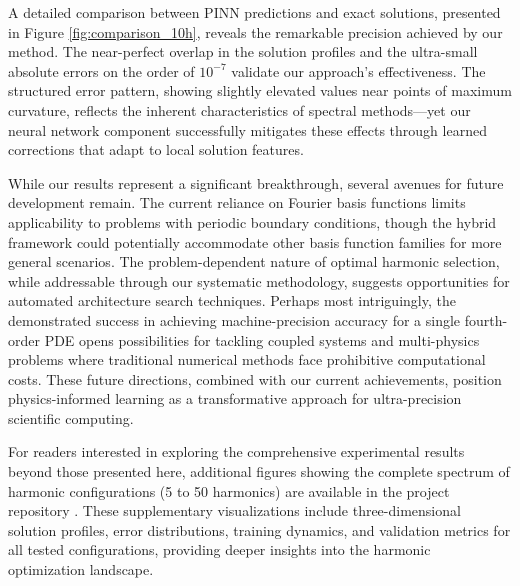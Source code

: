 A detailed comparison between PINN predictions and exact solutions, presented in Figure \ref{fig:comparison_10h}, reveals the remarkable precision achieved by our method. The near-perfect overlap in the solution profiles and the ultra-small absolute errors on the order of $10^{-7}$ validate our approach's effectiveness. The structured error pattern, showing slightly elevated values near points of maximum curvature, reflects the inherent characteristics of spectral methods—yet our neural network component successfully mitigates these effects through learned corrections that adapt to local solution features.

While our results represent a significant breakthrough, several avenues for future development remain. The current reliance on Fourier basis functions limits applicability to problems with periodic boundary conditions, though the hybrid framework could potentially accommodate other basis function families for more general scenarios. The problem-dependent nature of optimal harmonic selection, while addressable through our systematic methodology, suggests opportunities for automated architecture search techniques. Perhaps most intriguingly, the demonstrated success in achieving machine-precision accuracy for a single fourth-order PDE opens possibilities for tackling coupled systems and multi-physics problems where traditional numerical methods face prohibitive computational costs. These future directions, combined with our current achievements, position physics-informed learning as a transformative approach for ultra-precision scientific computing.

For readers interested in exploring the comprehensive experimental results beyond those presented here, additional figures showing the complete spectrum of harmonic configurations (5 to 50 harmonics) are available in the project repository \cite{lee2025github}. These supplementary visualizations include three-dimensional solution profiles, error distributions, training dynamics, and validation metrics for all tested configurations, providing deeper insights into the harmonic optimization landscape.